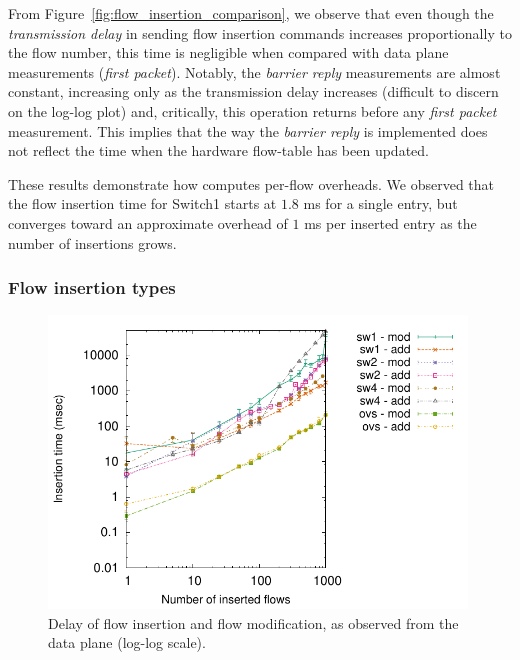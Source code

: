 From Figure~\ref{fig:flow_insertion_comparison}, we observe that even though the
\textit{transmission delay} in sending flow insertion commands increases
proportionally to the flow number, this time is negligible when compared with
data plane measurements (\textit{first packet}). Notably, the \textit{barrier
  reply} measurements are almost constant, increasing only as the
transmission delay increases (difficult to discern on the log-log plot) and,
critically, this operation returns before any \textit{first packet} measurement.
This implies that the way the \textit{barrier reply} is implemented does
not reflect the time when the hardware flow-table has been updated.

These results demonstrate how \oflops computes per-flow overheads. We
observed that the flow insertion time for Switch1 starts at $1.8$ ms for a single
entry, but converges toward an approximate overhead of $1$ ms per inserted entry
as the number of insertions grows.

\subsubsection*{Flow insertion types}

\begin{figure}[h]
  \begin{center}
    \includegraphics[width=0.99\textwidth]{Chapter1/Chapter1Figs/flow_insertion_delay}
  \end{center}
  \caption[Delay of flow insertion and flow modification]{Delay of flow insertion 
  and flow modification, as observed from the data plane (log-log scale).}
  \label{fig:flow_insertion_delay}
\end{figure}

